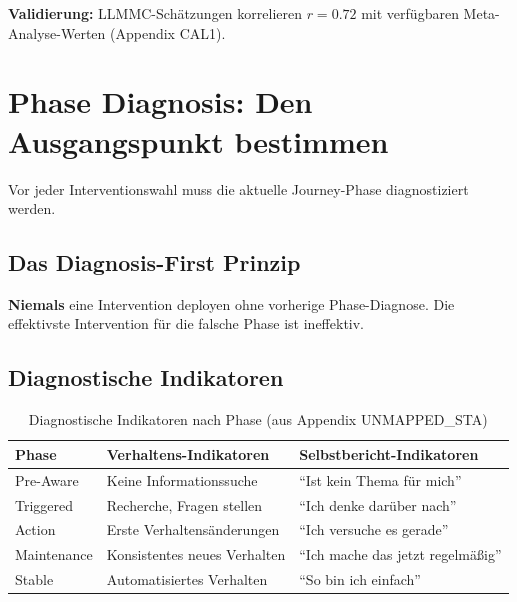 \textbf{Validierung:} LLMMC-Schätzungen korrelieren $r = 0.72$ mit verfügbaren Meta-Analyse-Werten (Appendix CAL1).


\section{Phase Diagnosis: Den Ausgangspunkt bestimmen}
\label{sec:18-diagnosis}

Vor jeder Interventionswahl muss die aktuelle Journey-Phase diagnostiziert werden.

\subsection{Das Diagnosis-First Prinzip}

\begin{tcolorbox}[colback=blue!5!white, colframe=blue!75!black,
    title=Prinzip: Diagnosis Before Intervention]
\textbf{Niemals} eine Intervention deployen ohne vorherige Phase-Diagnose. Die effektivste Intervention für die falsche Phase ist ineffektiv.
\end{tcolorbox}

\subsection{Diagnostische Indikatoren}

\begin{table}[htbp]
\centering
\caption{Diagnostische Indikatoren nach Phase (aus Appendix UNMAPPED_STA)}
\label{tab:18-diagnosis-indicators}
\renewcommand{\arraystretch}{1.4}
\small
\begin{tabular}{@{}lll@{}}
\toprule
\textbf{Phase} & \textbf{Verhaltens-Indikatoren} & \textbf{Selbstbericht-Indikatoren} \\
\midrule
Pre-Aware & Keine Informationssuche & ``Ist kein Thema für mich'' \\
Triggered & Recherche, Fragen stellen & ``Ich denke darüber nach'' \\
Action & Erste Verhaltensänderungen & ``Ich versuche es gerade'' \\
Maintenance & Konsistentes neues Verhalten & ``Ich mache das jetzt regelmäßig'' \\
Stable & Automatisiertes Verhalten & ``So bin ich einfach'' \\
\bottomrule
\end{tabular}
\end{table}

